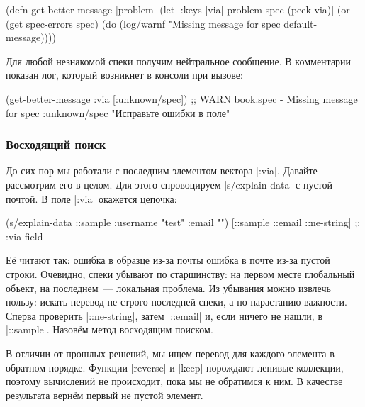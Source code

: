 \begin{english}
  \begin{clojure}
(defn get-better-message [problem]
  (let [{:keys [via]} problem
        spec (peek via)]
    (or (get spec-errors spec)
        (do (log/warnf "Missing message for spec %
            default-message))))
  \end{clojure}
\end{english}

\noindent
Для любой незнакомой спеки получим нейтральное сообщение. В комментарии показан
лог, который возникнет в консоли при вызове:

  \begin{clojure}
(get-better-message {:via [:unknown/spec]})
;; WARN book.spec - Missing message for spec :unknown/spec
"Исправьте ошибки в поле"
  \end{clojure}

\subsubsection{Восходящий поиск}

До сих пор мы работали с последним элементом вектора \spverb|:via|. Давайте
рассмотрим его в целом. Для этого спровоцируем \spverb|s/explain-data| с пустой
почтой. В поле \spverb|:via| окажется цепочка:

\begin{english}
  \begin{clojure}
(s/explain-data ::sample {:username "test" :email ""})
[::sample ::email ::ne-string] ;; :via field
  \end{clojure}
\end{english}

Е\"{е} читают так: ошибка в образце из-за почты \arr{} ошибка в почте из-за
пустой строки. Очевидно, спеки убывают по старшинству: на первом месте
глобальный объект, на последнем~--- локальная проблема. Из убывания можно
извлечь пользу: искать перевод не строго последней спеки, а по нарастанию
важности. Сперва проверить \spverb|::ne-string|, затем \spverb|::email| и, если
ничего не нашли, в \spverb|::sample|. Назов\"{е}м метод восходящим поиском.


В отличии от прошлых решений, мы ищем перевод для каждого элемента в обратном
порядке. Функции \spverb|reverse| и \spverb|keep| порождают ленивые коллекции,
поэтому вычислений не происходит, пока мы не обратимся к ним. В качестве
результата верн\"{е}м первый не пустой элемент.

